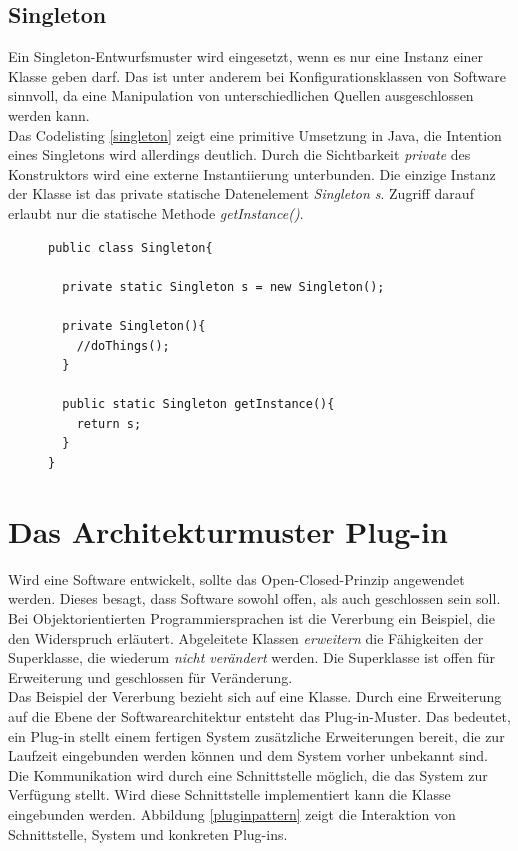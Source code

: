 \FloatBarrier
\subsection{Singleton}

Ein Singleton-Entwurfsmuster wird eingesetzt, wenn es nur eine Instanz einer Klasse geben darf\cite[3.4]{starke:swa}. Das ist unter anderem bei Konfigurationsklassen von Software sinnvoll, da eine Manipulation von unterschiedlichen Quellen ausgeschlossen werden kann.\\
Das Codelisting \ref{singleton} zeigt eine primitive Umsetzung in Java, die Intention eines Singletons wird allerdings deutlich. Durch die Sichtbarkeit \textit{private} des Konstruktors wird eine externe Instantiierung unterbunden. Die einzige Instanz der Klasse ist das private statische Datenelement \textit{Singleton s}. Zugriff darauf erlaubt nur die statische Methode \textit{getInstance()}.

\begin{figure}[htbp]
\begin{lstlisting}[frame=leftline]
public class Singleton{
		
  private static Singleton s = new Singleton();
		  
  private Singleton(){
    //doThings();
  }
		  
  public static Singleton getInstance(){
    return s;
  }
}
\end{lstlisting}

\end{figure}

\FloatBarrier
\section{Das Architekturmuster Plug-in}

Wird eine Software entwickelt, sollte das Open-Closed-Prinzip angewendet werden. Dieses besagt, dass Software sowohl offen, als auch geschlossen sein soll\cite[1.8]{goll:swa}. Bei Objektorientierten Programmiersprachen ist die Vererbung ein Beispiel, die den Widerspruch erläutert. Abgeleitete Klassen \textit{erweitern} die Fähigkeiten der Superklasse, die wiederum \textit{nicht verändert} werden. Die Superklasse ist offen für Erweiterung und geschlossen für Veränderung.\\
Das Beispiel der Vererbung bezieht sich auf eine Klasse. Durch eine Erweiterung auf die Ebene der Softwarearchitektur entsteht das Plug-in-Muster. Das bedeutet, ein Plug-in stellt einem fertigen System zusätzliche Erweiterungen bereit, die zur Laufzeit eingebunden werden können und dem System vorher unbekannt sind. Die Kommunikation wird durch eine Schnittstelle möglich, die das System zur Verfügung stellt. Wird diese Schnittstelle implementiert kann die Klasse eingebunden werden. Abbildung \ref{pluginpattern} zeigt die Interaktion von Schnittstelle, System und konkreten Plug-ins.

